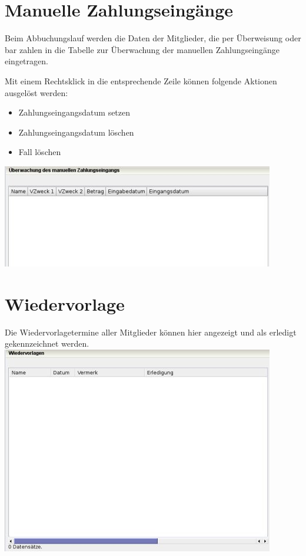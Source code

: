 \documentclass[a4paper,BCOR30mm,DIV14,pdftex,liststotoc,footsepline,openany]{scrbook}
\begin{document}
\chapter{Manuelle Zahlungseingänge}
Beim Abbuchungslauf werden die Daten der Mitglieder, die per Überweisung oder bar zahlen in die Tabelle zur Überwachung der manuellen Zahlungseingänge eingetragen.

Mit einem Rechtsklick in die entsprechende Zeile können folgende Aktionen ausgelöst werden:

\begin{itemize}
 \item Zahlungseingangsdatum setzen
 \item Zahlungseingangsdatum löschen
 \item Fall löschen
\end{itemize}

\includegraphics{./screenshots/manuellerzahlungseingang.jpg}\\

\chapter{Wiedervorlage}
Die Wiedervorlagetermine aller Mitglieder können hier angezeigt und als erledigt gekennzeichnet werden.\\
\includegraphics{./screenshots/listewiedervorlagen.jpg}\\
\end{document}
